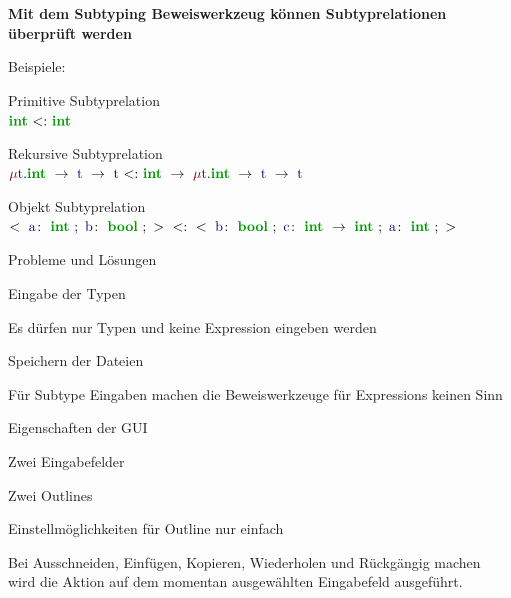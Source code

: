 {

  \textbf{Mit dem Subtyping Beweiswerkzeug können Subtyprelationen überprüft werden} \\[6mm]
  \begin{itemgroup}{Beispiele:}
    \item Primitive Subtyprelation \\  $\TypeSubType {\TypeIntegerType} {\TypeIntegerType} $
    \item Rekursive Subtyprelation \\  $\TypeSubType{ \TypeRecType{\TypeTypeName{t} } {\TypeArrowType
       {\TypeIntegerType }{\TypeArrowType{\TypeTypeName{t}}{\TypeTypeName{t}}}}}
       {\TypeArrowType{\TypeIntegerType}{\TypeRecType{\TypeTypeName{t}}{\TypeArrowType
       {\TypeIntegerType}{\TypeArrowType{\TypeTypeName{t}}{\TypeTypeName{t}}}}}} $
    \item Objekt Subtyprelation \\     $\TypeSubType{\TypeObjectType{\TypeRowType{{\ExprIdentifier{a}}
       \colon\ {\TypeIntegerType}\ ;\ {\ExprIdentifier{b}}\colon\  \TypeBooleanType}\ ;}} 
       {\TypeObjectType{\TypeRowType{{\ExprIdentifier{b}}\colon\ {\TypeBooleanType}\ ;\ {\ExprIdentifier{c}}
       \colon\ {\TypeArrowType{\TypeIntegerType}{\TypeIntegerType}}\ ;\ {\ExprIdentifier{a}}\colon\ {\TypeIntegerType}
       \ ;}}}$
    \end{itemgroup}
}
{
  \begin{itemgroup}{Probleme und Lösungen}
    \item Eingabe der Typen
    \item Es dürfen nur Typen und keine Expression eingeben werden
    \item Speichern der Dateien
    \item Für Subtype Eingaben machen die Beweiswerkzeuge für Expressions keinen Sinn
    \end{itemgroup}
}

{
  \begin{itemgroup}{Eigenschaften der GUI}
    \item Zwei Eingabefelder
    \item Zwei Outlines
    \item Einstellmöglichkeiten für Outline nur einfach
    \item Bei Ausschneiden, Einfügen, Kopieren, Wiederholen und Rückgängig machen wird die Aktion auf dem momentan
    ausgewählten Eingabefeld ausgeführt.
    \end{itemgroup}
}

